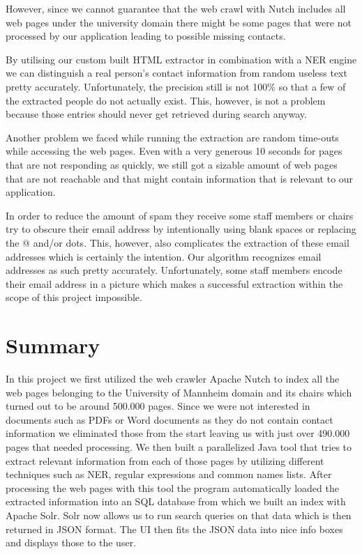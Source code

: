 \documentclass[11pt,titlepage,oneside,openany]{article}
\begin{document}
However, since we cannot guarantee that the web crawl with Nutch includes all web pages under the university domain there might be some pages that were not processed by our application leading to possible missing contacts.

By utilising our custom built HTML extractor in combination with a NER engine we can distinguish a real person’s contact information from random useless text pretty accurately. Unfortunately, the precision still is not 100\% so that a few of the extracted people do not actually exist. This, however, is not a problem because those entries should never get retrieved during search anyway.

Another problem we faced while running the extraction are random time-outs while accessing the web pages. Even with a very generous 10 seconds for pages that are not responding as quickly, we still got a sizable amount of web pages that are not reachable and that might contain information that is relevant to our application.

In order to reduce the amount of spam they receive some staff members or chairs try to obscure their email address by intentionally using blank spaces or replacing the @ and/or dots. This, however, also complicates the extraction of these email addresses which is certainly the intention. Our algorithm recognizes email addresses as such pretty accurately. Unfortunately, some staff members encode their email address in a picture which makes a successful extraction within the scope of this project impossible. 


\section{Summary}
In this project we first utilized the web crawler Apache Nutch to index all the web pages belonging to the University of Mannheim domain and its chairs which turned out to be around 500.000 pages. Since we were not interested in documents such as PDFs or Word documents as they do not contain contact information we eliminated those from the start leaving us with just over 490.000 pages that needed processing. We then built a parallelized Java tool that tries to extract relevant information from each of those pages by utilizing different techniques such as NER, regular expressions and common names lists. After processing the web pages with this tool the program automatically loaded the extracted information into an SQL database from which we built an index with Apache Solr.
Solr now allows us to run search queries on that data which is then returned in JSON format. The UI then fits the JSON data into nice info boxes and displays those to the user.



%
%





\newpage





\end{document}
